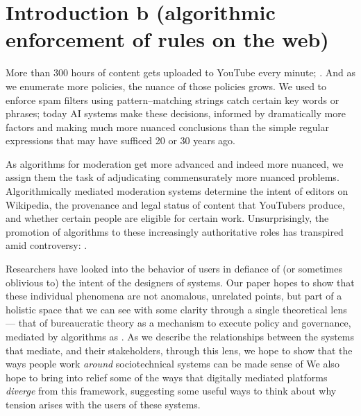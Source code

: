 \documentclass[main]{subfiles}
\begin{document}
\section{Introduction b (algorithmic enforcement of rules on the web)}\label{sec:introduction b}


More than 300 hours of content gets uploaded to YouTube every minute;
.
And as we enumerate more policies, the nuance of those policies grows.
We used to enforce spam filters using pattern--matching strings catch certain key words or phrases;
today AI systems make these decisions, informed by dramatically more factors and making much more nuanced conclusions than the simple regular expressions that may have sufficed 20 or 30 years ago.

As algorithms for moderation get more advanced and indeed more nuanced, we assign them the task of adjudicating commensurately more nuanced problems.
Algorithmically mediated moderation systems determine the intent of editors on Wikipedia, the provenance and legal status of content that YouTubers produce, and whether certain people are eligible for certain work.
Unsurprisingly, the promotion of algorithms to these increasingly authoritative roles has transpired amid controversy:
.

Researchers have looked into the behavior of users in defiance of (or sometimes oblivious to) the intent of the designers of systems.
Our paper hopes to show that these individual phenomena are not anomalous, unrelated points, but part of a holistic space that we can see with some clarity through a single theoretical lens --- that of bureaucratic theory as a mechanism to execute policy and governance, mediated by algorithms as .
As we describe the relationships between the systems that mediate, and their stakeholders, through this lens, we hope to show that the ways people work \textit{around} sociotechnical systems can be made sense of 
We also hope to bring into relief some of the ways that digitally mediated platforms \textit{diverge} from this framework, suggesting some useful ways to think about why tension arises with the users of these systems.
\end{document}
